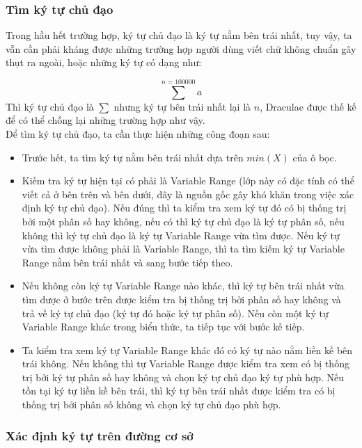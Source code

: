 \documentclass[a4paper,12pt]{article}
\begin{document}
	\subsubsection*{Tìm ký tự chủ đạo}
	
	Trong hầu hết trường hợp, ký tự chủ đạo là ký tự nằm bên trái nhất, tuy vậy, ta vẫn cần phải kháng được những trường hợp người dùng viết chữ không chuẩn gây thụt ra ngoài, hoặc những ký tự có dạng như:
	
	$$ \sum^{n = 100000} a $$
	Thì ký tự chủ đạo là $\sum$ nhưng ký tự bên trái nhất lại là $n$, Draculae được thế kế để có thể chống lại những trường hợp như vậy.\\
	
	Để tìm ký tự chủ đạo, ta cần thực hiện những công đoạn sau:
	\begin{itemize}
		\item Trước hết, ta tìm ký tự nằm bên trái nhất dựa trên $min(X)$ của ô bọc.
		\item Kiếm tra ký tự hiện tại có phải là Variable Range (lớp này có đặc tính có thể viết cả ở bên trên và bên dưới, đây là nguồn gốc gây khó khăn trong việc xác định ký tự chủ đạo). Nếu đúng thì ta kiểm tra xem ký tự đó có bị thống trị bởi một phân số hay không, nếu có thì ký tự chủ đạo là ký tự phân số, nếu không thì ký tự chủ đạo là ký tự Variable Range vừa tìm được. Nếu ký tự vừa tìm được không phải là Variable Range, thì ta tìm kiếm ký tự Variable Range nằm bên trái nhất và sang bước tiếp theo.
		
		\item Nếu không còn ký tự Variable Range nào khác, thì ký tự bên trái nhất vừa tìm được ở bước trên được kiểm tra bị thống trị bởi phân số hay không và trả về ký tự chủ đạo (ký tự đó hoặc ký tự phân số). Nếu còn một ký tự Variable Range khác trong biểu thức, ta tiếp tục với bước kế tiếp.
		
		\item Ta kiểm tra xem ký tự Variable Range khác đó có ký tự nào nằm liền kề bên trái không. Nếu không thì tự Variable Range được kiểm tra xem có bị thống trị bởi ký tự phân số hay không và chọn ký tự chủ đạo ký tự phù hợp. Nếu tồn tại ký tự liền kề bên trái, thì ký tự bên trái nhất được kiểm tra có bị thống trị bởi phân số không và chọn ký tự chủ đạo phù hợp.
		
	\end{itemize}
	
	\subsubsection*{Xác định ký tự trên đường cơ sở}
	
\end{document}
